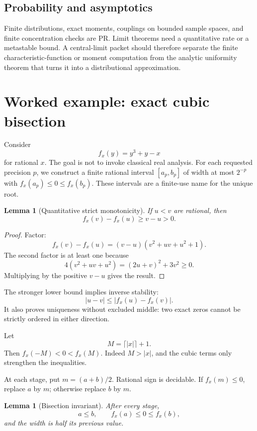 \documentclass[11pt]{article}
\newtheorem{lemma}[theorem]{Lemma}
\begin{document}
\subsection{Probability and asymptotics}

Finite distributions, exact moments, couplings on bounded sample spaces, and
finite concentration checks are PR.  Limit theorems need a quantitative rate or
a metastable bound.  A central-limit packet should therefore separate the
finite characteristic-function or moment computation from the analytic
uniformity theorem that turns it into a distributional approximation.

\section{Worked example: exact cubic bisection}
\label{sec:cubic}

Consider
\[
  f_x(y)=y^3+y-x
\]
for rational \(x\).  The goal is not to invoke classical real analysis.  For
each requested precision \(p\), we construct a finite rational interval
\([a_p,b_p]\) of width at most \(2^{-p}\) with
\(f_x(a_p)\le0\le f_x(b_p)\).  These intervals are a finite-use name for the
unique root.

\begin{lemma}[Quantitative strict monotonicity]
\label{lem:cubic-monotone}
If \(u<v\) are rational, then
\[
  f_x(v)-f_x(u)\ge v-u>0.
\]
\end{lemma}

\begin{proof}
Factor:
\[
 f_x(v)-f_x(u)=(v-u)(v^2+uv+u^2+1).
\]
The second factor is at least one because
\[
  4(v^2+uv+u^2)=(2u+v)^2+3v^2\ge0.
\]
Multiplying by the positive \(v-u\) gives the result.
\end{proof}

The stronger lower bound implies inverse stability:
\[
  |u-v|\le |f_x(u)-f_x(v)|.
\]
It also proves uniqueness without excluded middle: two exact zeros cannot be
strictly ordered in either direction.

Let
\[
  M=\lceil |x|\rceil+1.
\]
Then \(f_x(-M)<0<f_x(M)\).  Indeed \(M>|x|\), and the cubic terms only strengthen
the inequalities.

At each stage, put \(m=(a+b)/2\).  Rational sign is decidable.  If
\(f_x(m)\le0\), replace \(a\) by \(m\); otherwise replace \(b\) by \(m\).

\begin{lemma}[Bisection invariant]
After every stage,
\[
  a\le b,\qquad f_x(a)\le0\le f_x(b),
\]
and the width is half its previous value.
\end{lemma}
\end{document}
